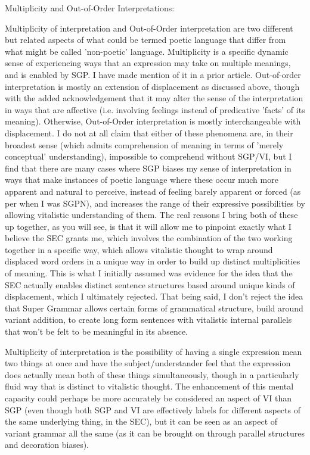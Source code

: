 \documentclass[]{article}
\begin{document}
Multiplicity and Out-of-Order Interpretations:


Multiplicity of interpretation and Out-of-Order interpretation are two different but related aspects of what could be termed poetic language that differ from what might be called 'non-poetic' language. Multiplicity is a specific dynamic sense of experiencing ways that an expression may take on multiple meanings, and is enabled by SGP. I have made mention of it in a prior article. Out-of-order interpretation is mostly an extension of displacement as discussed above, though with the added acknowledgement that it may alter the sense of the interpretation in ways that are affective (i.e. involving feelings instead of predicative 'facts' of its meaning). Otherwise, Out-of-Order interpretation is mostly interchangeable with displacement. I do not at all claim that either of these phenomena are, in their broadest sense (which admits comprehension of meaning in terms of 'merely conceptual' understanding), impossible to comprehend without SGP/VI, but I find that there are many cases where SGP biases my sense of interpretation in ways that make instances of poetic language where these occur much more apparent and natural to perceive, instead of feeling barely apparent or forced (as per when I was SGPN), and increases the range of their expressive possibilities by allowing vitalistic understanding of them. The real reasons I bring both of these up together, as you will see, is that it will allow me to pinpoint exactly what I believe the SEC grants me, which involves the combination of the two working together in a specific way, which allows vitalistic thought to wrap around displaced word orders in a unique way in order to build up distinct multiplicities of meaning. This is what I initially assumed was evidence for the idea that the SEC actually enables distinct sentence structures based around unique kinds of displacement, which I ultimately rejected. That being said, I don't reject the idea that Super Grammar allows certain forms of grammatical structure, build around variant addition, to create long form sentences with vitalistic internal parallels that won't be felt to be meaningful in its absence.



Multiplicity of interpretation is the possibility of having a single expression mean two things at once and have the subject/understander feel that the expression does actually mean both of these things simultaneously, though in a particularly fluid way that is distinct to vitalistic thought. The enhancement of this mental capacity could perhaps be more accurately be considered an aspect of VI than SGP (even though both SGP and VI are effectively labels for different aspects of the same underlying thing, in the SEC), but it can be seen as an aspect of variant grammar all the same (as it can be brought on through parallel structures and decoration biases).
\end{document}
